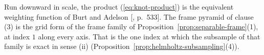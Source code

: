 Run downward in scale, the product (\ref{eq:knot-product}) is the equivalent weighting function of
Burt and Adelson [, p.~533]. The frame pyramid of clause (3) is the
grid form of the frame \Matern{} family of
Proposition~\ref{prop:separable-frame}(1), at index $1$ along every axis. That is the one index at
which the subsample of that family is exact in sense (ii)
(Proposition~\ref{prop:helmholtz-subsampling}(4)).

